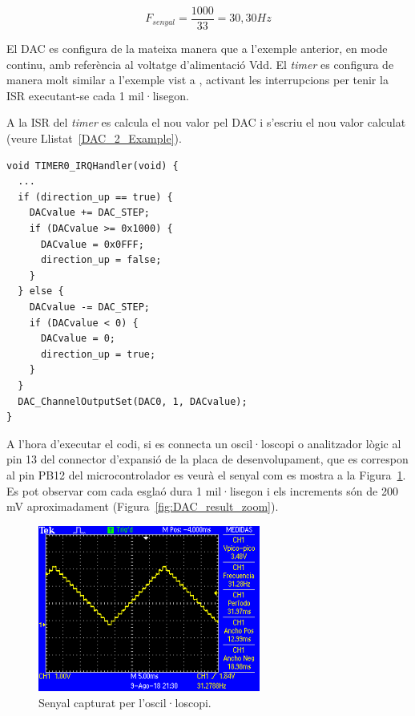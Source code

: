 \begin{equation}
\label{eq:F_DAC_2}
 F_{senyal} = \frac{1000}{33} = 30,30 Hz
\end{equation}

El DAC es configura de la mateixa manera que a l'exemple anterior, en mode continu, amb referència al voltatge d'alimentació \gls{Vdd}. El {\em timer} es configura de manera molt similar a l'exemple vist a , activant les interrupcions per tenir la ISR executant-se cada 1 mil·lisegon.

A la \gls{ISR} del {\em timer} es calcula el nou valor pel \gls{DAC} i s'escriu el nou valor calculat (veure Llistat~\ref{DAC_2_Example}).

\begin{lstlisting}[style=customc, caption=Part de la ISR del Timer per generar la dada pel DAC, label=DAC_2_Example]
void TIMER0_IRQHandler(void) {
  ...
  if (direction_up == true) {
    DACvalue += DAC_STEP;
    if (DACvalue >= 0x1000) {
      DACvalue = 0x0FFF;
      direction_up = false;
    }
  } else {
    DACvalue -= DAC_STEP;
    if (DACvalue < 0) {
      DACvalue = 0;
      direction_up = true;
    }
  }
  DAC_ChannelOutputSet(DAC0, 1, DACvalue);
}
\end{lstlisting}

A l'hora d'executar el codi, si es connecta un oscil·loscopi o analitzador lògic al pin 13 del connector d'expansió de la placa de desenvolupament, que es correspon al pin PB12 del microcontrolador es veurà el senyal com es mostra a la Figura~\ref{fig:DAC_result}. Es pot observar com cada esglaó dura 1 mil·lisegon i els increments són de 200 mV aproximadament (Figura~\ref{fig:DAC_result_zoom}).

\begin{figure}
 \centering
 \includegraphics[width=0.65\textwidth, keepaspectratio]{imatges/DAC_result_osc}
 \caption{Senyal capturat per l'oscil·loscopi.}
 \label{fig:DAC_result}
\end{figure}

